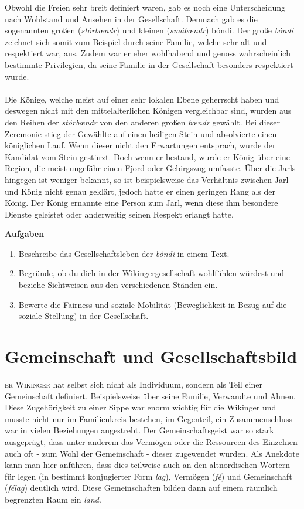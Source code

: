 \documentclass[12pt,a4paper,ngerman,openany]{book}
\newcommand{\flettrine}[2]{\lettrine[lines=2, depth=0, loversize=0.25, nindent=0.69pt, lraise=0.15]{\initfamily{#1}}{#2}}
\newcommand*\initfamily{\usefont{U}{GotIn}{xl}{n}}
\newcommand{\aufgaben}[1]{
  \begin{tcolorbox}
    \textbf{Aufgaben}
    \begin{enumerate}
      #1
    \end{enumerate}
  \end{tcolorbox}
} %
\newcommand{\erklaer}[2]{\leavevmode\marginpar{\footnotesize \textbf{\textit{#1:}}\\#2}\ignorespaces \textit{#1}} %
\begin{document}
Obwohl die Freien sehr breit definiert waren, gab es noch eine Unterscheidung nach Wohlstand und Ansehen in der Gesellschaft. Demnach gab es die sogenannten großen (\textit{stórbœndr}) und kleinen (\textit{smábœndr}) bóndi. 
Der große \textit{bóndi} zeichnet sich somit zum Beispiel durch seine Familie, welche sehr alt und respektiert war, aus. Zudem war er eher wohlhabend und genoss wahrscheinlich bestimmte Privilegien, da seine Familie in der Gesellschaft besonders respektiert wurde.\\\\
Die Könige, welche meist auf einer sehr lokalen Ebene geherrscht haben und deswegen nicht mit den mittelalterlichen Königen vergleichbar sind, wurden aus den Reihen der \textit{stórbœndr} von den anderen \glqq großen\grqq{} \erklaer{bœndr}{Plural von \textit{bóndi}.} gewählt. Bei dieser Zeremonie stieg der Gewählte auf einen heiligen Stein und absolvierte einen königlichen Lauf. Wenn dieser nicht den Erwartungen entsprach, wurde der Kandidat vom Stein gestürzt. Doch wenn er bestand, wurde er König über eine Region, die meist ungefähr einen Fjord oder Gebirgszug umfasste.
Über die Jarls hingegen ist weniger bekannt, so ist beispielsweise das Verhältnis zwischen Jarl und König nicht genau geklärt, jedoch hatte er einen geringen Rang als der König. Der König ernannte eine Person zum Jarl, wenn diese ihm besondere Dienste geleistet oder anderweitig seinen Respekt erlangt hatte.

\aufgaben{
  \item Beschreibe das Gesellschaftsleben der \textit{bóndi} in einem Text.
  \item Begründe, ob du dich in der Wikingergesellschaft wohlfühlen würdest und beziehe Sichtweisen aus den verschiedenen Ständen ein.
  \item Bewerte die Fairness und soziale Mobilität (Beweglichkeit in Bezug auf die soziale Stellung) in der Gesellschaft.
}

\section{Gemeinschaft und Gesellschaftsbild}
\flettrine{D}{er Wikinger} hat selbst sich nicht als Individuum, sondern als Teil einer Gemeinschaft definiert. Beispielsweise über seine Familie, Verwandte und Ahnen. Diese Zugehörigkeit zu einer Sippe war enorm wichtig für die Wikinger und musste nicht nur im Familienkreis bestehen, im Gegenteil, ein Zusammenschluss war in vielen Beziehungen angestrebt. Der Gemeinschaftsgeist war so stark ausgeprägt, dass unter anderem das Vermögen oder die Ressourcen des Einzelnen auch oft - zum Wohl der Gemeinschaft - dieser zugewendet wurden. Als Anekdote kann man hier anführen, dass dies teilweise auch an den altnordischen Wörtern für legen (in bestimmt konjugierter Form \textit{lag}), Vermögen (\textit{fé}) und Gemeinschaft (\textit{félag}) deutlich wird. Diese Gemeinschaften bilden dann auf einem räumlich begrenzten Raum ein \textit{land}.
\end{document}
